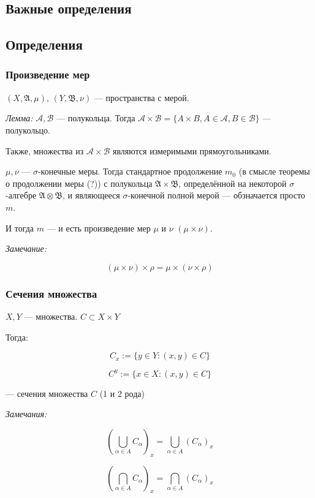 \documentclass{article}
\begin{document}
\subsection{Важные определения}

\newpage

\subsection{Определения}
\subsubsection{Произведение мер}
$(X, \mathfrak{A}, \mu)$, $(Y, \mathfrak{B}, \nu)$ --- пространства с мерой.

\textit{Лемма: }
$\mathcal{A}, \mathcal{B}$ --- полукольца. Тогда $\mathcal{A} \times \mathcal{B} = \{A \times B, A \in \mathcal{A}, B \in \mathcal{B}\}$ --- полукольцо.

Также, множества из $\mathcal{A} \times \mathcal{B}$ являются измеримыми прямоугольниками.

$\mu, \nu$ --- $\sigma$-конечные меры. Тогда стандартное продолжение $m_{0}$ (в смысле теоремы о продолжении меры (?)) с полукольца $\mathfrak{A} \times \mathfrak{B}$, определённой на некоторой $\sigma$-алгебре $\mathfrak{A} \otimes \mathfrak{B}$, и являющееся $\sigma$-конечной полной мерой --- обзначается просто $m$.

И тогда $m$ --- и есть произведение мер $\mu$ и $\nu$ $(\mu \times \nu)$.

\textit{Замечание: }

\[(\mu \times \nu) \times \rho = \mu \times (\nu \times \rho)\]

\subsubsection{Сечения множества}

$X, Y$ --- множества. $C \subset X \times Y$

Тогда: 

\[C_{x} := \{y \in Y: (x, y) \in C\}\]

\[C^{y} := \{x \in X: (x, y) \in C\}\]

--- сечения множества $C$ (1 и 2 рода)

\textit{Замечания: }

\[\left(\bigcup_{\alpha \in A} C_{\alpha}\right)_{x} = \bigcup_{\alpha \in A} \left(C_{\alpha}\right)_{x}\]

\[\left(\bigcap_{\alpha \in A} C_{\alpha}\right)_{x} = \bigcap_{\alpha \in A} \left(C_{\alpha}\right)_{x}\]
\end{document}
